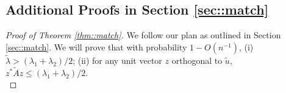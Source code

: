 \documentclass[12pt]{article}%
\theoremstyle{plain}%
\theoremstyle{remark}
\begin{document}
\subsection{Additional Proofs in Section \ref{sec::match}}

\begin{proof}[Proof of Theorem \ref{thm::match}]
We follow our plan as outlined in Section \ref{sec::match}. We will prove that with probability $1 - O(n^{-1})$, (i) $\tilde{\lambda} > (\lambda_1 + \lambda_2)/2$; (ii) for any unit vector $z$ orthogonal to $\tilde{u}$, $z^* \tilde{A} z \le (\lambda_1 + \lambda_2)/2$. \\


\end{proof}
\end{document}
